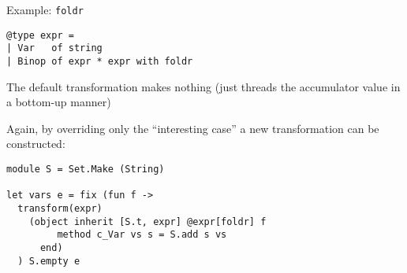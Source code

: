 \documentclass{beamer}
\theoremstyle{definition}
\theoremstyle{plain} %
\begin{document}

\begin{comment}
  The next example is somewhat similar: this time we reuse another typical transformation, \lstinline|foldr|, which ``folds'' a
  data structure in a bottom-up manner. Note, the type $t$ is not parametric, so the type of the transformation is
  $\iota \to t \to \iota$ (the inherited and synthesized attributes have the same type this time). In other words, there is
  no place for a function ``to fold with'', and the implementation does nothing except for a threading the inherited attribute
  through all the nodes and returning it back unchanged.
  Yet we can make use of this seemingly useless transformation: if we properly redefine its behaviour for one constructor (\lstinline|Var|), it
  will collect all the variables for us. Again, we modified the behaviour only for the ``interesting case''.
\end{comment}

\begin{frame}[fragile]{Example: \lstinline[basicstyle=\Large]|foldr|}
  
\begin{lstlisting}
@type expr =
| Var   of string
| Binop of expr * expr with foldr
\end{lstlisting}

The default transformation makes nothing (just threads the accumulator value in a bottom-up manner)
\vskip5mm

Again, by overriding only the ``interesting case'' a new transformation can be constructed:
\vskip5mm

\begin{lstlisting}
module S = Set.Make (String)
                    
let vars e = fix (fun f ->
  transform(expr)
    (object inherit [S.t, expr] @expr[foldr] f
         method c_Var vs s = S.add s vs
      end)
  ) S.empty e
\end{lstlisting}
\end{frame}


\begin{comment}
  The previous example can be equally implemented for polymorphic variant types. This time we use an open recursion: our
  type in not recursive, but polymorphic. We also implemened variable collector as a class, not as an immediate
  object. Of course, this is a preparation for the ``expression problem'' solution.
\end{comment}
\end{document}
